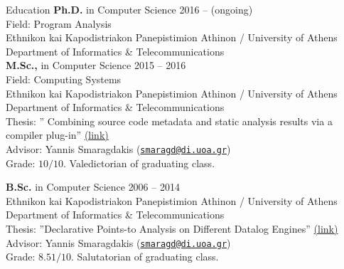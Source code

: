 \documentclass{resume}
\begin{document}
\newcommand{\mytilde}{\raise.17ex\hbox{$\scriptstyle\mathtt{\sim}$}}
\newcommand{\indentitem}{\setlength\itemindent{25pt}}


\begin{rSection}{Education}
{\bf Ph.D.} in Computer Science \hfill {2016 -- (ongoing) } \\
Field: Program Analysis \\
Ethnikon kai Kapodistriakon Panepistimion Athinon / University of Athens \\
Department of Informatics \& Telecommunications \\

{\bf M.Sc.,} in Computer Science \hfill {2015 -- 2016 } \\
Field: Computing Systems \\
Ethnikon kai Kapodistriakon Panepistimion Athinon / University of Athens \\
Department of Informatics \& Telecommunications \\
Thesis: '' Combining source code metadata and static analysis results via a compiler plug-in'' \href{http://cgi.di.uoa.gr/~smaragd/theses/antoniadis2.pdf}{ (link)} \\
Advisor: Yannis Smaragdakis
  (\href{mailto:smaragd@di.uoa.gr}{\nolinkurl{smaragd@di.uoa.gr}}) \\
Grade: $10 / 10$. Valedictorian of graduating class.

{\bf B.Sc.} in Computer Science \hfill {2006 -- 2014}  \\
Ethnikon kai Kapodistriakon Panepistimion Athinon / University of Athens \\
Department of Informatics \& Telecommunications \\
Thesis: ''Declarative Points-to Analysis on Different Datalog Engines'' \href{http://cgi.di.uoa.gr/~smaragd/theses/antoniadis.pdf}{ (link)} \\
Advisor: Yannis Smaragdakis
  (\href{mailto:smaragd@di.uoa.gr}{\nolinkurl{smaragd@di.uoa.gr}}) \\
Grade: $8.51 / 10$. Salutatorian of graduating class.

\end{rSection}

\end{document}
